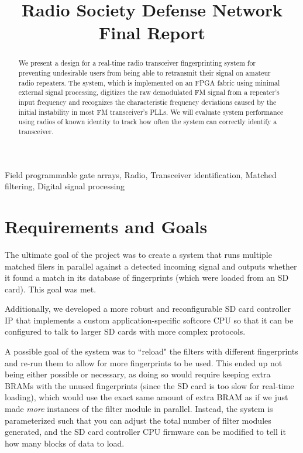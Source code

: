 \documentclass[conference]{IEEEtran}
\begin{document}
\title{Radio Society Defense Network Final Report}

\author{
}

\maketitle

\begin{abstract}
We present a design for a real-time radio transceiver fingerprinting system for preventing undesirable users from being able to retransmit their signal on amateur radio repeaters. The system, which is implemented on an FPGA fabric using minimal external signal processing, digitizes the raw demodulated FM signal from a repeater's input frequency and recognizes the characteristic frequency deviations caused by the initial instability in most FM transceiver's PLLs. We will evaluate system performance using radios of known identity to track how often the system can correctly identify a transceiver.
\end{abstract}

\begin{IEEEkeywords}
Field programmable gate arrays, Radio, Transceiver identification, Matched filtering, Digital signal processing
\end{IEEEkeywords}

\section{Requirements and Goals}

The ultimate goal of the project was to create a system that runs multiple matched filers in parallel against a detected incoming signal and outputs whether it found a match in its database of fingerprints (which were loaded from an SD card). This goal was met.

Additionally, we developed a more robust and reconfigurable SD card controller IP that implements a custom application-specific softcore CPU so that it can be configured to talk to larger SD cards with more complex protocols.

A possible goal of the system was to ``reload" the filters with different fingerprints and re-run them to allow for more fingerprints to be used. This ended up not being either possible or necessary, as doing so would require keeping extra BRAMs with the unused fingerprints (since the SD card is too slow for real-time loading), which would use the exact same amount of extra BRAM as if we just made \emph{more} instances of the filter module in parallel. Instead, the system is parameterized such that you can adjust the total number of filter modules generated, and the SD card controller CPU firmware can be modified to tell it how many blocks of data to load.
\end{document}
